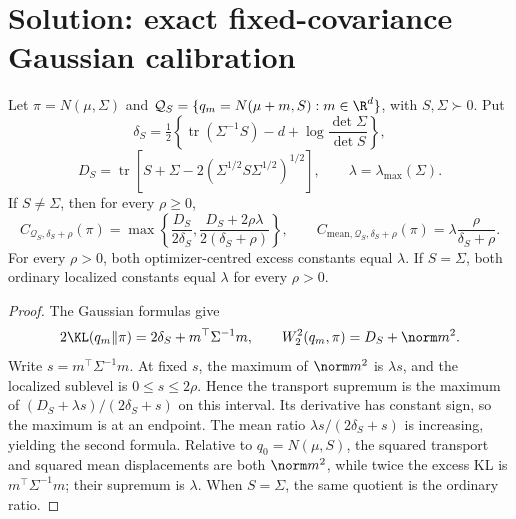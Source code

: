 \documentclass[../main.tex]{subfiles}
\begin{document}

\section*{Solution: exact fixed-covariance Gaussian calibration}

\begin{theorem}
Let $\pi=N(\mu,\Sigma)$ and
$\mathcal Q_S=\{q_m=N(\mu+m,S):m\in\R^d\}$, with $S,\Sigma\succ0$. Put
\[
 \delta_S=\tfrac12\left\{\operatorname{tr}(\Sigma^{-1}S)-d
 +\log\frac{\det\Sigma}{\det S}\right\},
\]
\[
 D_S=\operatorname{tr}\left[S+\Sigma
 -2(\Sigma^{1/2}S\Sigma^{1/2})^{1/2}\right],
 \qquad\lambda=\lambda_{\max}(\Sigma).
\]
If $S\ne\Sigma$, then for every $\rho\ge0$,
\[
 C_{\mathcal Q_S,\delta_S+\rho}(\pi)
 =\max\left\{\frac{D_S}{2\delta_S},
 \frac{D_S+2\rho\lambda}{2(\delta_S+\rho)}\right\},
 \qquad
 C_{\mathrm{mean},\mathcal Q_S,\delta_S+\rho}(\pi)
 =\lambda\frac{\rho}{\delta_S+\rho}.
\]
For every $\rho>0$, both optimizer-centred excess constants equal $\lambda$. If
$S=\Sigma$, both ordinary localized constants equal $\lambda$ for every $\rho>0$.
\end{theorem}

\begin{proof}
The Gaussian formulas give
\[
 2\KL(q_m\|\pi)=2\delta_S+m^\top\Sigma^{-1}m,
 \qquad W_2^2(q_m,\pi)=D_S+\norm m^2.
\]
Write $s=m^\top\Sigma^{-1}m$. At fixed $s$, the maximum of $\norm m^2$ is $\lambda s$,
and the localized sublevel is $0\le s\le2\rho$. Hence the transport supremum is the maximum
of $(D_S+\lambda s)/(2\delta_S+s)$ on this interval. Its derivative has constant sign, so the
maximum is at an endpoint. The mean ratio $\lambda s/(2\delta_S+s)$ is increasing, yielding
the second formula. Relative to $q_0=N(\mu,S)$, the squared transport and squared mean
displacements are both $\norm m^2$, while twice the excess KL is
$m^\top\Sigma^{-1}m$; their supremum is $\lambda$. When $S=\Sigma$, the same quotient is the
ordinary ratio.
\end{proof}
\end{document}
